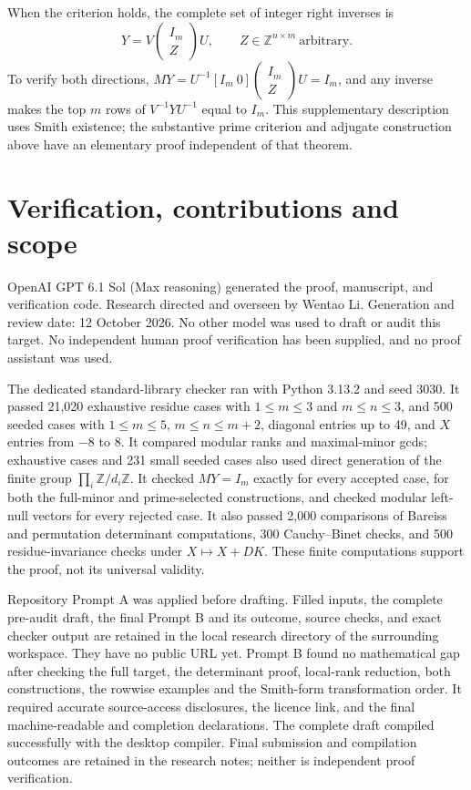 \documentclass[11pt]{article}
\newcommand{\Z}{\mathbb Z}
\begin{document}
When the criterion holds, the complete set of integer right inverses is
\begin{equation}\label{eq:all}
 Y=V\begin{pmatrix}I_m\\Z\end{pmatrix}U,
 \qquad Z\in\Z^{n\times m}\ \text{arbitrary}.
\end{equation}
To verify both directions, $MY=U^{-1}[I_m\ 0]\begin{pmatrix}I_m\\Z\end{pmatrix}U
=I_m$, and any inverse makes the top $m$ rows of $V^{-1}YU^{-1}$
equal to $I_m$. This supplementary description uses Smith existence;
the substantive prime criterion and adjugate construction above have
an elementary proof independent of that theorem.

\section{Verification, contributions and scope}
OpenAI GPT 6.1 Sol (Max reasoning) generated the proof, manuscript, and
verification code. Research directed and overseen by Wentao Li.
Generation and review date: 12 October 2026. No other model was used
to draft or audit this target. No independent human proof verification
has been supplied, and no proof assistant was used.

The dedicated standard-library checker
 ran with
Python 3.13.2 and seed 3030. It passed 21,020 exhaustive residue cases
with $1\le m\le3$ and $m\le n\le3$, and 500 seeded cases with
$1\le m\le5$, $m\le n\le m+2$, diagonal entries up to 49, and $X$
entries from $-8$ to $8$. It compared modular ranks and maximal-minor
gcds; exhaustive cases and 231 small seeded cases also used direct
generation of the finite group $\prod_i\Z/d_i\Z$. It checked
$MY=I_m$ exactly for every accepted case, for both the full-minor and
prime-selected constructions, and checked modular left-null vectors
for every rejected case. It also passed 2,000 comparisons of Bareiss
and permutation determinant computations, 300 Cauchy--Binet checks,
and 500 residue-invariance checks under $X\mapsto X+DK$.
These finite computations support the proof, not its universal validity.

Repository Prompt A was applied before drafting. Filled inputs, the
complete pre-audit draft, the final Prompt B and its outcome, source
checks, and exact checker output are retained in the local research
directory  of
the surrounding workspace. They have no public URL yet. Prompt B found no mathematical gap after checking the full target,
the determinant proof, local-rank reduction, both constructions, the
rowwise examples and the Smith-form transformation order. It required
accurate source-access disclosures, the licence link, and the final
machine-readable and completion declarations. The complete draft
compiled successfully with the desktop compiler. Final submission and
compilation outcomes are retained in the research notes; neither is
independent proof verification.
\end{document}
